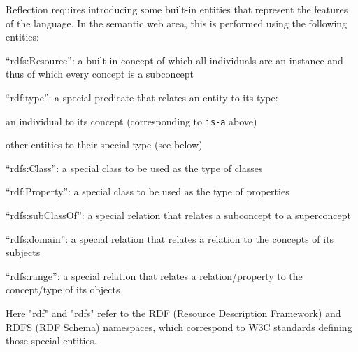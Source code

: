 Reflection requires introducing some built-in entities that represent the features of the language.
In the semantic web area, this is performed using the following entities:
\begin{compactitem}
 \item \enquote{rdfs:Resource}: a built-in concept of which all individuals are an instance and thus of which every concept is a subconcept
 \item \enquote{rdf:type}: a special predicate that relates an entity to its type:
  \begin{compactitem}
   \item an individual to its concept (corresponding to \texttt{is-a} above)
   \item other entities to their special type (see below)
  \end{compactitem}
 \item \enquote{rdfs:Class}: a special class to be used as the type of classes
 \item \enquote{rdf:Property}: a special class to be used as the type of properties
 \item \enquote{rdfs:subClassOf}: a special relation that relates a subconcept to a superconcept
 \item \enquote{rdfs:domain}: a special relation that relates a relation to the concepts of its subjects
 \item \enquote{rdfs:range}: a special relation that relates a relation/property to the concept/type of its objects
\end{compactitem}
Here "rdf" and "rdfs" refer to the RDF (Resource Description Framework) and RDFS (RDF Schema) namespaces, which correspond to W3C standards defining those special entities.

